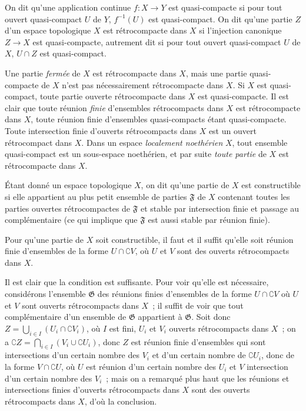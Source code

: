 \begin{definition}[9.1.1]
\label{0.9.1.1-fr}
On dit qu'une application continue $f:X\to Y$ est quasi-compacte si
pour tout ouvert quasi-compact $U$ de $Y$, $f^{-1}(U)$ est quasi-compact. On
dit qu'une partie $Z$ d'un espace topologique $X$ est rétrocompacte
dans $X$ si l'injection canonique $Z\to X$ est quasi-compacte, autrement dit
si pour tout ouvert quasi-compact $U$ de $X$, $U\cap Z$ est quasi-compact.
\end{definition}

Une partie \emph{fermée} de $X$ est rétrocompacte dans $X$, mais une partie
quasi-compacte de $X$ n'est pas nécessairement rétrocompacte dans $X$. Si
$X$ est quasi-compact, toute partie ouverte rétrocompacte dans $X$ est
quasi-compacte. Il est clair que toute réunion \emph{finie} d'ensembles
rétrocompacts dans $X$ est rétrocompacte dans $X$, toute réunion finie
d'ensembles quasi-compacts étant quasi-compacte. Toute intersection finie
d'ouverts rétrocompacts dans $X$ est un ouvert rétrocompact dans $X$. Dans un
espace \emph{localement noethérien} $X$, tout ensemble quasi-compact est un
sous-espace noethérien, et par suite \emph{toute partie} de $X$ est
rétrocompacte dans $X$.

\begin{definition}[9.1.2]
\label{0.9.1.2-fr}
Étant donné un espace topologique $X$, on dit qu'une partie de $X$ est
constructible si elle appartient au plus petit ensemble de parties
$\mathfrak{F}$ de $X$ contenant toutes les parties ouvertes rétrocompactes de
$\mathfrak{F}$ et stable par intersection finie et passage au complémentaire
\textup{(ce qui implique que $\mathfrak{F}$ est aussi} stable par réunion finie\textup{)}.
\end{definition}

\begin{proposition}[9.1.3]
\label{0.9.1.3-fr}
Pour qu'une partie de $X$ soit constructible, il faut et il suffit qu'elle
soit réunion finie d'ensembles de la forme $U\cap\complement{V}$, où $U$ et
$V$ sont des ouverts rétrocompacts dans $X$.
\end{proposition}

Il est clair que la condition est suffisante. Pour voir qu'elle est
nécessaire, considérons l'ensemble $\mathfrak{G}$ des réunions finies
d'ensembles de la forme $U\cap\complement{V}$ où $U$ et $V$ sont ouverts
rétrocompacts dans $X$~; il suffit de voir que tout complémentaire d'un
ensemble de $\mathfrak{G}$ appartient à $\mathfrak{G}$. Soit donc
$Z=\bigcup_{i\in I}(U_i\cap\complement{V_i})$, où $I$ est fini, $U_i$ et
$V_i$ ouverts rétrocompacts dans $X$~; on a
$\complement{Z}=\bigcap_{i\in I}(V_i\cup\complement{U_i})$, donc
$Z$ est réunion finie d'ensembles qui sont intersections d'un
certain nombre des $V_i$ et d'un certain nombre de $\complement{U_i}$, donc
de la forme
$V\cap\complement{U}$, où $U$ est réunion d'un certain nombre des $U_i$ et
$V$ intersection d'un certain nombre des $V_i$~; mais on a remarqué plus
haut que les réunions et intersections finies d'ouverts rétrocompacts dans
$X$ sont des ouverts rétrocompacts dans $X$, d'où la conclusion.

